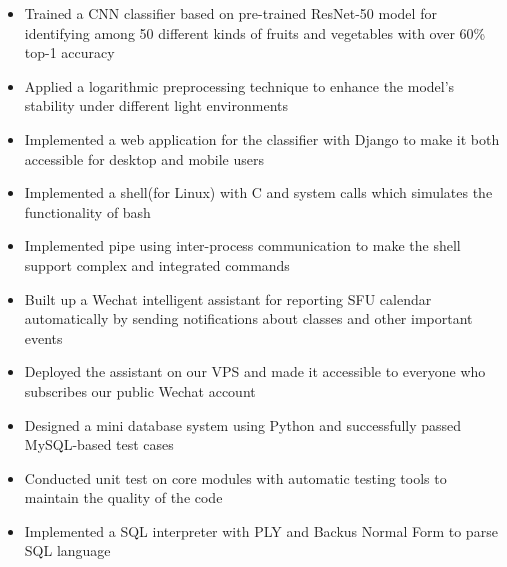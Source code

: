 \documentclass[11pt,a4paper,sans]{moderncv}   %
\begin{document}
{%
\begin{itemize}%
\item Trained a CNN classifier based on pre-trained ResNet-50 model for identifying among 50 different kinds of fruits and vegetables with over 60\% top-1 accuracy%
\item Applied a logarithmic preprocessing technique to enhance the model's stability under different light environments
\item Implemented a web application for the classifier with Django to make it both accessible for desktop and mobile users
\end{itemize}
}

{%
\begin{itemize}%
\item Implemented a shell(for Linux) with C and system calls which simulates the functionality of bash%
\item Implemented pipe using inter-process communication to make the shell support complex and integrated commands
\end{itemize}
}


{%
\begin{itemize}%
\item Built up a Wechat intelligent assistant for reporting SFU calendar automatically by sending notifications about classes and other important events%
\item Deployed the assistant on our VPS and made it accessible to everyone who subscribes our public Wechat account
\end{itemize}
}

{%
\begin{itemize}%
\item Designed a mini database system using Python and successfully passed MySQL-based test cases
%
\item Conducted unit test on core modules with automatic testing tools to maintain the quality of the code
%
\item Implemented a SQL interpreter with PLY and Backus Normal Form to parse SQL language
%
\end{itemize}
}
\end{document}

